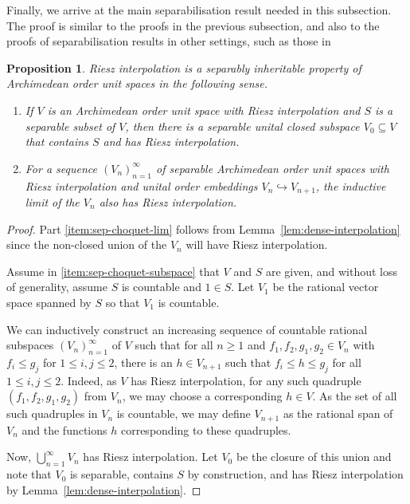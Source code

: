 \documentclass[a4paper,11pt]{amsart}
\newtheorem{proposition}[theorem]{Proposition}
\theoremstyle{definition}
\numberwithin{equation}{section}
\numberwithin{theorem}{section}
\begin{document}
Finally, we arrive at the main separabilisation result needed in this subsection.  The proof is similar to the proofs in the previous subsection, and also to the proofs of separabilisation results in other settings, such as those in \cite[Section~II.8.5]{Bl06}

\begin{proposition}\label{prop:sep-choquet}
	Riesz interpolation is a separably inheritable property of Archimedean order unit spaces in the following sense.
	\begin{enumerate}
		\item\label{item:sep-choquet-subspace} If $V$ is an Archimedean order unit space with Riesz interpolation and $S$ is a separable subset of $V$, then there is a separable unital closed subspace $V_0 \subseteq V$ that contains $S$ and has Riesz interpolation.
		\item\label{item:sep-choquet-lim} For a sequence $(V_n)_{n=1}^\infty$ of separable Archimedean order unit spaces with Riesz interpolation and unital order embeddings $V_n \hookrightarrow V_{n+1}$, the inductive limit of the $V_n$ also has Riesz interpolation.
	\end{enumerate}
\end{proposition}

\begin{proof}
	Part \ref{item:sep-choquet-lim} follows from Lemma~\ref{lem:dense-interpolation} since the non-closed union of the $V_n$ will have Riesz interpolation.
	
	Assume in \ref{item:sep-choquet-subspace} that $V$ and $S$ are given, and without loss of generality, assume $S$ is countable and $1 \in S$.  Let $V_1$ be the rational vector space spanned by $S$ so that $V_1$ is countable.  
	
	We can inductively construct an increasing sequence of countable rational subspaces $(V_n)_{n=1}^\infty$ of $V$ such that for all $n \geq 1$ and $f_1, f_2, g_1, g_2 \in V_n$ with $f_i \leq g_j$ for $1 \leq i, j \leq 2$, there is an $h \in V_{n+1}$ such that $f_i \leq h \leq g_j$ for all $1 \leq i, j \leq 2$.  Indeed, as $V$ has Riesz interpolation, for any such quadruple $(f_1, f_2, g_1, g_2)$ from $V_n$, we may choose a corresponding $h \in V$.  As the set of all such quadruples in $V_n$ is countable, we may define $V_{n+1}$ as the rational span of $V_n$ and the functions $h$ corresponding to these quadruples.  
	
	Now, $\bigcup_{n=1}^\infty V_n$ has Riesz interpolation.  Let $V_0$ be the closure of this union and note that $V_0$ is separable, contains $S$ by construction, and has Riesz interpolation by Lemma~\ref{lem:dense-interpolation}.
\end{proof}
\end{document}
